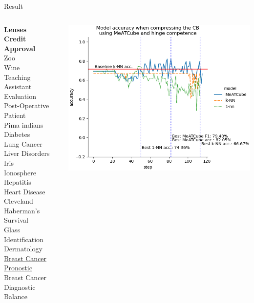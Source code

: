 \documentclass[]{beamer}
\begin{document}
\begin{frame}{Result}
    \begin{columns}
        \begin{column}{.35\textwidth}
            {\smaller\smaller
            \textbf{Lenses} \\
            \textbf{Credit Approval} \\
            Zoo \\
            Wine \\
            Teaching Assistant Evaluation \\
            Post-Operative Patient \\
            Pima indians Diabetes \\
            Lung Cancer \\
            Liver Disorders \\
            Iris \\
            Ionosphere \\
            Hepatitis \\
            Heart Disease Cleveland \\
            Haberman's Survival \\
            Glass Identification \\
            Dermatology \\
            \underline{Breast Cancer Pronostic} \\
            Breast Cancer Diagnostic \\
            Balance\\
            ~}
        \end{column}
        \begin{column}{.65\textwidth}
            \includegraphics[width=.8\textwidth]{../results/figs/breast+cancer+wisconsin+prognostic.png}

\end{column}
\end{columns}
\end{frame}
\end{document}
